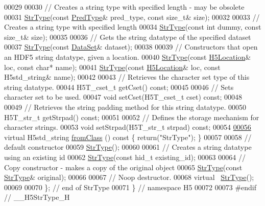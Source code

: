 \begin{DoxyCode}
00029 
00030         \textcolor{comment}{// Creates a string type with specified length - may be obsolete}
00031         \hyperlink{class_h5_1_1_str_type}{StrType}(\textcolor{keyword}{const} \hyperlink{class_h5_1_1_pred_type}{PredType}& pred\_type, \textcolor{keyword}{const} \textcolor{keywordtype}{size\_t}& size);
00032 
00033         \textcolor{comment}{// Creates a string type with specified length}
00034         \hyperlink{class_h5_1_1_str_type}{StrType}(\textcolor{keyword}{const} \textcolor{keywordtype}{int} dummy, \textcolor{keyword}{const} \textcolor{keywordtype}{size\_t}& size);
00035 
00036         \textcolor{comment}{// Gets the string datatype of the specified dataset}
00037         \hyperlink{class_h5_1_1_str_type}{StrType}(\textcolor{keyword}{const} \hyperlink{class_h5_1_1_data_set}{DataSet}& dataset);
00038 
00039         \textcolor{comment}{// Constructors that open an HDF5 string datatype, given a location.}
00040         \hyperlink{class_h5_1_1_str_type}{StrType}(\textcolor{keyword}{const} \hyperlink{class_h5_1_1_h5_location}{H5Location}& loc, \textcolor{keyword}{const} \textcolor{keywordtype}{char}* name);
00041         \hyperlink{class_h5_1_1_str_type}{StrType}(\textcolor{keyword}{const} \hyperlink{class_h5_1_1_h5_location}{H5Location}& loc, \textcolor{keyword}{const} H5std\_string& name);
00042 
00043         \textcolor{comment}{// Retrieves the character set type of this string datatype.}
00044         H5T\_cset\_t getCset() \textcolor{keyword}{const};
00045 
00046         \textcolor{comment}{// Sets character set to be used.}
00047         \textcolor{keywordtype}{void} setCset(H5T\_cset\_t cset) \textcolor{keyword}{const};
00048 
00049         \textcolor{comment}{// Retrieves the string padding method for this string datatype.}
00050         H5T\_str\_t getStrpad() \textcolor{keyword}{const};
00051 
00052         \textcolor{comment}{// Defines the storage mechanism for character strings.}
00053         \textcolor{keywordtype}{void} setStrpad(H5T\_str\_t strpad) \textcolor{keyword}{const};
00054 
\hyperlink{class_h5_1_1_str_type_acafed9b8354f9578341682e29b5b6712}{00056}         \textcolor{keyword}{virtual} H5std\_string \hyperlink{class_h5_1_1_str_type_acafed9b8354f9578341682e29b5b6712}{fromClass} ()\textcolor{keyword}{ const }\{ \textcolor{keywordflow}{return}(\textcolor{stringliteral}{"StrType"}); \}
00057 
00058         \textcolor{comment}{// default constructor}
00059         \hyperlink{class_h5_1_1_str_type}{StrType}();
00060 
00061         \textcolor{comment}{// Creates a string datatype using an existing id}
00062         \hyperlink{class_h5_1_1_str_type}{StrType}(\textcolor{keyword}{const} hid\_t existing\_id);
00063 
00064         \textcolor{comment}{// Copy constructor - makes a copy of the original object}
00065         \hyperlink{class_h5_1_1_str_type}{StrType}(\textcolor{keyword}{const} \hyperlink{class_h5_1_1_str_type}{StrType}& original);
00066 
00067         \textcolor{comment}{// Noop destructor.}
00068         \textcolor{keyword}{virtual} ~\hyperlink{class_h5_1_1_str_type}{StrType}();
00069 
00070 \}; \textcolor{comment}{// end of StrType}
00071 \} \textcolor{comment}{// namespace H5}
00072 
00073 \textcolor{preprocessor}{#endif // \_\_H5StrType\_H}
\end{DoxyCode}
